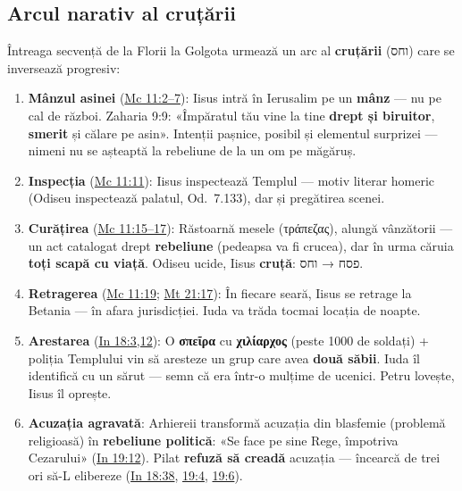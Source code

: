 \documentclass[12pt,a4paper,twoside,openany]{book}
\begin{document}
\subsection{Arcul narativ al cruțării}

Întreaga secvență de la Florii la Golgota urmează un arc al \textbf{cruțării} (וחס) care se inversează progresiv:

\begin{enumerate}
  \item \textbf{Mânzul asinei} (\href{https://bibliaortodoxa.ro/carte.php?id=53\&cap=11\#2}{Mc 11:2--7}): Iisus intră în Ierusalim pe un \textbf{mânz} — nu pe cal de război. Zaharia 9:9: «Împăratul tău vine la tine \textbf{drept și biruitor}, \textbf{smerit} și călare pe asin». Intenții pașnice, posibil și elementul surprizei — nimeni nu se așteaptă la rebeliune de la un om pe măgăruș.
  \item \textbf{Inspecția} (\href{https://bibliaortodoxa.ro/carte.php?id=53\&cap=11\#11}{Mc 11:11}): Iisus inspectează Templul — motiv literar homeric (Odiseu inspectează palatul, Od.\ 7.133), dar și pregătirea scenei.
  \item \textbf{Curățirea} (\href{https://bibliaortodoxa.ro/carte.php?id=53\&cap=11\#15}{Mc 11:15--17}): Răstoarnă mesele (τράπεζας), alungă vânzătorii — un act catalogat drept \textbf{rebeliune} (pedeapsa va fi crucea), dar în urma căruia \textbf{toți scapă cu viață}. Odiseu ucide, Iisus \textbf{cruță}: פסח → וחס.
  \item \textbf{Retragerea} (\href{https://bibliaortodoxa.ro/carte.php?id=53\&cap=11\#19}{Mc 11:19}; \href{https://bibliaortodoxa.ro/carte.php?id=55\&cap=21\#17}{Mt 21:17}): În fiecare seară, Iisus se retrage la Betania — în afara jurisdicției. Iuda va trăda tocmai locația de noapte.
  \item \textbf{Arestarea} (\href{https://bibliaortodoxa.ro/carte.php?id=35\&cap=18\#3}{In 18:3,12}): O \textbf{σπεῖρα} cu \textbf{χιλίαρχος} (peste 1000 de soldați) + poliția Templului vin să aresteze un grup care avea \textbf{două săbii}. Iuda îl identifică cu un sărut — semn că era într-o mulțime de ucenici. Petru lovește, Iisus îl oprește.
  \item \textbf{Acuzația agravată}: Arhiereii transformă acuzația din blasfemie (problemă religioasă) în \textbf{rebeliune politică}: «Se face pe sine Rege, împotriva Cezarului» (\href{https://bibliaortodoxa.ro/carte.php?id=35\&cap=19\#12}{In 19:12}). Pilat \textbf{refuză să creadă} acuzația — încearcă de trei ori să-L elibereze (\href{https://bibliaortodoxa.ro/carte.php?id=35\&cap=18\#38}{In 18:38}, \href{https://bibliaortodoxa.ro/carte.php?id=35\&cap=19\#4}{19:4}, \href{https://bibliaortodoxa.ro/carte.php?id=35\&cap=19\#6}{19:6}).

\end{enumerate}
\end{document}
